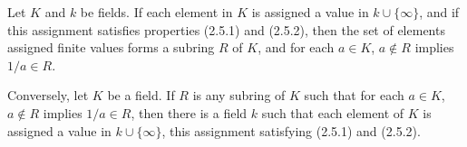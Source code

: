Let $K$ and $k$ be fields. If each element in $K$ is assigned a value in $k \cup \{\infty\}$, and if this assignment satisfies properties (2.5.1) and (2.5.2), then the set of elements assigned finite values forms a subring $R$ of $K$, and for each $a \in K$, $a \notin R$ implies $1/a \in R$.

Conversely, let $K$ be a field. If $R$ is any subring of $K$ such that for each $a \in K$, $a \notin R$ implies $1/a \in R$, then there is a field $k$ such that each element of $K$ is assigned a value in $k \cup \{\infty\}$, this assignment satisfying (2.5.1) and (2.5.2).
